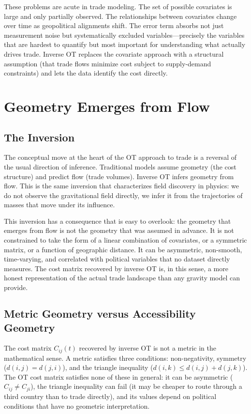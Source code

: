 \documentclass[12pt]{article}
\begin{document}
These problems are acute in trade modeling. The set of possible covariates is large and only partially observed. The relationships between covariates change over time as geopolitical alignments shift. The error term absorbs not just measurement noise but systematically excluded variables---precisely the variables that are hardest to quantify but most important for understanding what actually drives trade. Inverse OT replaces the covariate approach with a structural assumption (that trade flows minimize cost subject to supply-demand constraints) and lets the data identify the cost directly.

\section{Geometry Emerges from Flow}

\subsection{The Inversion}

The conceptual move at the heart of the OT approach to trade is a reversal of the usual direction of inference. Traditional models assume geometry (the cost structure) and predict flow (trade volumes). Inverse OT infers geometry from flow. This is the same inversion that characterizes field discovery in physics: we do not observe the gravitational field directly, we infer it from the trajectories of masses that move under its influence.

This inversion has a consequence that is easy to overlook: the geometry that emerges from flow is not the geometry that was assumed in advance. It is not constrained to take the form of a linear combination of covariates, or a symmetric matrix, or a function of geographic distance. It can be asymmetric, non-smooth, time-varying, and correlated with political variables that no dataset directly measures. The cost matrix recovered by inverse OT is, in this sense, a more honest representation of the actual trade landscape than any gravity model can provide.

\subsection{Metric Geometry versus Accessibility Geometry}

The cost matrix $C_{ij}(t)$ recovered by inverse OT is not a metric in the mathematical sense. A metric satisfies three conditions: non-negativity, symmetry ($d(i,j) = d(j,i)$), and the triangle inequality ($d(i,k) \leq d(i,j) + d(j,k)$). The OT cost matrix satisfies none of these in general: it can be asymmetric ($C_{ij} \neq C_{ji}$), the triangle inequality can fail (it may be cheaper to route through a third country than to trade directly), and its values depend on political conditions that have no geometric interpretation.
\end{document}
